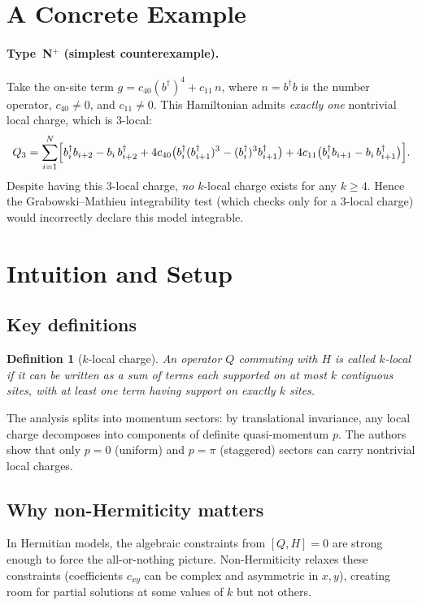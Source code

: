 \documentclass[11pt,a4paper]{article}
\newtheorem{definition}[theorem]{Definition}
\begin{document}
\section{A Concrete Example}

\paragraph{Type~N$^+$ (simplest counterexample).}
Take the on-site term $g = c_{40}(b^\dagger)^4 + c_{11}\,n$, where $n = b^\dagger b$ is the number operator, $c_{40}\neq 0$, and $c_{11}\neq 0$.
This Hamiltonian admits \emph{exactly one} nontrivial local charge, which is $3$-local:
\[
Q_3 = \sum_{i=1}^{N}\Bigl[
  b_i^\dagger b_{i+2} - b_i\,b_{i+2}^\dagger
  + 4c_{40}\bigl(b_i^\dagger (b_{i+1}^\dagger)^3 - (b_i^\dagger)^3 b_{i+1}^\dagger\bigr)
  + 4c_{11}\bigl(b_i^\dagger b_{i+1} - b_i\,b_{i+1}^\dagger\bigr)
\Bigr].
\]
Despite having this $3$-local charge, \emph{no} $k$-local charge exists for any $k \ge 4$. Hence the Grabowski--Mathieu integrability test (which checks only for a $3$-local charge) would incorrectly declare this model integrable.

\section{Intuition and Setup}

\subsection*{Key definitions}
\begin{definition}[$k$-local charge]
An operator $Q$ commuting with $H$ is called \emph{$k$-local} if it can be written as a sum of terms each supported on at most $k$ contiguous sites, with at least one term having support on exactly $k$ sites.
\end{definition}

The analysis splits into momentum sectors: by translational invariance, any local charge decomposes into components of definite quasi-momentum $p$. The authors show that only $p=0$ (uniform) and $p=\pi$ (staggered) sectors can carry nontrivial local charges.

\subsection*{Why non-Hermiticity matters}
In Hermitian models, the algebraic constraints from $[Q,H]=0$ are strong enough to force the all-or-nothing picture. Non-Hermiticity relaxes these constraints (coefficients $c_{xy}$ can be complex and asymmetric in $x,y$), creating room for partial solutions at some values of $k$ but not others.
\end{document}
